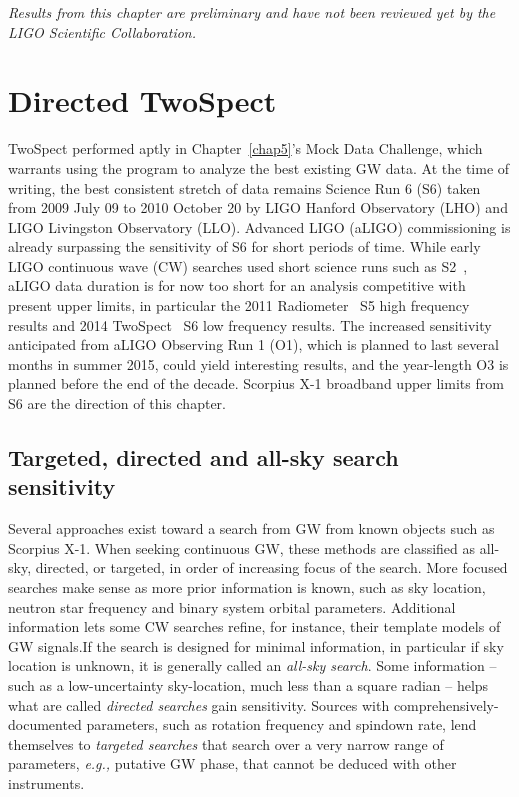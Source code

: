 
\textit{Results from this chapter are preliminary and have not been reviewed yet by the LIGO Scientific Collaboration.}

        \section{Directed TwoSpect}
        \label{directed}

TwoSpect performed aptly in Chapter~\ref{chap5}'s Mock Data Challenge, which warrants using the program to analyze the best existing GW data.
At the time of writing, the best consistent stretch of data remains Science Run 6 (S6) taken from 2009 July 09 to 2010 October 20 by LIGO Hanford Observatory (LHO) and LIGO Livingston Observatory (LLO).
Advanced LIGO (aLIGO) commissioning is already surpassing the sensitivity of S6 for short periods of time.
While early LIGO continuous wave (CW) searches used short science runs such as S2~\cite{AbbottScoX12007}, aLIGO data duration is for now too short for an analysis competitive with present upper limits, in particular the 2011 Radiometer~\cite{AbadieStoch2011} S5 high frequency results and 2014 TwoSpect~\cite{GoetzTwoSpectResults2014} S6 low frequency results.
The increased sensitivity anticipated from aLIGO Observing Run 1 (O1), which is planned to last several months in summer 2015, could yield interesting results, and the year-length O3 is planned before the end of the decade.
Scorpius X-1 broadband upper limits from S6 are the direction of this chapter.


            \subsection{Targeted, directed and all-sky search sensitivity}
            \label{tradeoffs}

Several approaches exist toward a search from GW from known objects such as Scorpius X-1.
When seeking continuous GW, these methods are classified as all-sky, directed, or targeted, in order of increasing focus of the search.
More focused searches make sense as more prior information is known, such as sky location, neutron star frequency and binary system orbital parameters.
Additional information lets some CW searches refine, for instance, their template models of GW signals.If the search is designed for minimal information, in particular if sky location is unknown, it is generally called an \textit{all-sky search}.
Some information -- such as a low-uncertainty sky-location, much less than a square radian -- helps what are called \textit{directed searches} gain sensitivity.
Sources with comprehensively-documented parameters, such as rotation frequency and spindown rate, lend themselves to \textit{targeted searches} that search over a very narrow range of parameters, \textit{e.g.,} putative GW phase, that cannot be deduced with other instruments.

